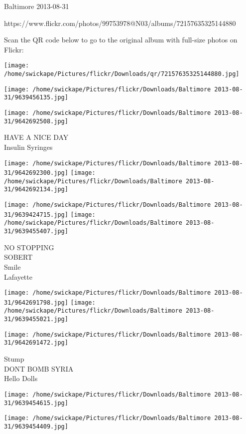 \documentclass[10pt,letterpaper]{article}
\begin{document}
Baltimore 2013-08-31

https://www.flickr.com/photos/99753978@N03/albums/72157635325144880

Scan the QR code below to go to the original album with full-size photos on Flickr:

\texttt{[image: /home/swickape/Pictures/flickr/Downloads/qr/72157635325144880.jpg]}
\pagebreak

\texttt{[image: /home/swickape/Pictures/flickr/Downloads/Baltimore 2013-08-31/9639456135.jpg]}

\vspace{0.25in}
\texttt{[image: /home/swickape/Pictures/flickr/Downloads/Baltimore 2013-08-31/9642692508.jpg]}

HAVE A NICE DAY\\
Insulin Syringes
\pagebreak

\texttt{[image: /home/swickape/Pictures/flickr/Downloads/Baltimore 2013-08-31/9642692300.jpg]}
\texttt{[image: /home/swickape/Pictures/flickr/Downloads/Baltimore 2013-08-31/9642692134.jpg]}

\texttt{[image: /home/swickape/Pictures/flickr/Downloads/Baltimore 2013-08-31/9639424715.jpg]}
\texttt{[image: /home/swickape/Pictures/flickr/Downloads/Baltimore 2013-08-31/9639455407.jpg]}

NO STOPPING\\
SOBERT\\
Smile\\
Lafayette
\pagebreak

\texttt{[image: /home/swickape/Pictures/flickr/Downloads/Baltimore 2013-08-31/9642691798.jpg]}
\texttt{[image: /home/swickape/Pictures/flickr/Downloads/Baltimore 2013-08-31/9639455021.jpg]}

\texttt{[image: /home/swickape/Pictures/flickr/Downloads/Baltimore 2013-08-31/9642691472.jpg]}

Stump\\
DONT BOMB SYRIA\\
Hello Dolls
\pagebreak

\texttt{[image: /home/swickape/Pictures/flickr/Downloads/Baltimore 2013-08-31/9639454615.jpg]}

\vspace{0.25in}
\texttt{[image: /home/swickape/Pictures/flickr/Downloads/Baltimore 2013-08-31/9639454409.jpg]}
\end{document}
